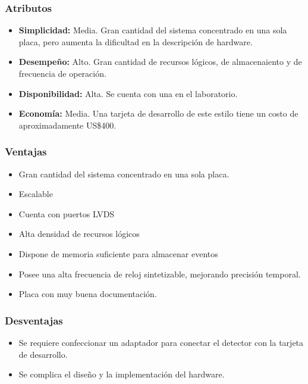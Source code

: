 \newpage
\subsubsection*{Atributos}
\begin{itemize}
	\item \textbf{Simplicidad:}  Media. Gran cantidad del sistema concentrado en una sola placa, pero aumenta la dificultad en la descripción de hardware.
	\item \textbf{Desempeño:}  Alto. Gran cantidad de recursos lógicos, de almacenaiento y de frecuencia de operación.
	\item \textbf{Disponibilidad: } Alta. Se cuenta con una en el laboratorio.
	\item \textbf{Economía: } Media. Una tarjeta de desarrollo de este estilo tiene un costo de aproximadamente US\$400.
\end{itemize}

\subsubsection*{Ventajas}
\begin{itemize}
	\item Gran cantidad del sistema concentrado en una sola placa.
	\item Escalable
	\item Cuenta con puertos LVDS
	\item Alta densidad de recursos lógicos
	\item Dispone de memoria suficiente para almacenar eventos
	\item Posee una alta frecuencia de reloj sintetizable, mejorando precisión temporal.
	\item Placa con muy buena documentación.
\end{itemize}


\subsubsection*{Desventajas}
\begin{itemize}
	\item Se requiere confeccionar un adaptador para conectar el detector con la tarjeta de desarrollo.
	\item Se complica el diseño y la implementación del hardware.
\end{itemize}




